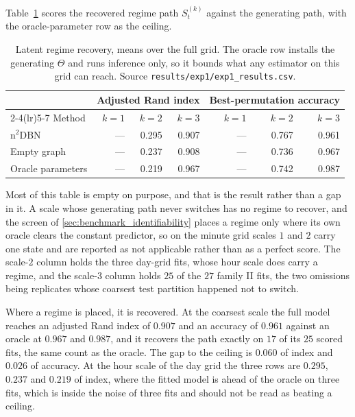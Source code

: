 Table~\ref{tab:results:latent} scores the recovered regime path $S_t^{(k)}$
against the generating path, with the oracle-parameter row as the ceiling.

\begin{table}[t]
\centering
\caption{Latent regime recovery, means over the full grid. The oracle row
installs the generating $\Theta$ and runs inference only, so it bounds what any
estimator on this grid can reach. Source
\texttt{results/exp1/exp1\_results.csv}.}
\label{tab:results:latent}
\begin{tabular}{lrrrrrr}
\toprule
& \multicolumn{3}{c}{Adjusted Rand index} & \multicolumn{3}{c}{Best-permutation accuracy} \\
\cmidrule(lr){2-4}\cmidrule(lr){5-7}
Method & $k=1$ & $k=2$ & $k=3$ & $k=1$ & $k=2$ & $k=3$ \\
\midrule
n$^2$DBN          & --- & 0.295 & 0.907 & --- & 0.767 & 0.961 \\
Empty graph       & --- & 0.237 & 0.908 & --- & 0.736 & 0.967 \\
Oracle parameters & --- & 0.219 & 0.967 & --- & 0.742 & 0.987 \\
\bottomrule
\end{tabular}
\end{table}

Most of this table is empty on purpose, and that is the result rather than a
gap in it. A scale whose generating path never switches has no regime to
recover, and the screen of \cref{sec:benchmark_identifiability} places a regime
only where its own oracle clears the constant predictor, so on the minute grid
scales $1$ and $2$ carry one state and are reported as not applicable rather
than as a perfect score. The scale-$2$ column holds the three day-grid fits,
whose hour scale does carry a regime, and the scale-$3$ column holds $25$ of the
$27$ family II fits, the two omissions being replicates whose coarsest test
partition happened not to switch.

Where a regime is placed, it is recovered. At the coarsest scale the full model
reaches an adjusted Rand index of $0.907$ and an accuracy of $0.961$ against an
oracle at $0.967$ and $0.987$, and it recovers the path exactly on $17$ of its
$25$ scored fits, the same count as the oracle. The gap to the ceiling is
$0.060$ of index and $0.026$ of accuracy. At the hour scale of the day grid the
three rows are $0.295$, $0.237$ and $0.219$ of index, where the fitted model is
ahead of the oracle on three fits, which is inside the noise of three fits and
should not be read as beating a ceiling.

